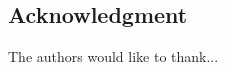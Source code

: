 \documentclass[journal]{IEEEtran}
\begin{document}
\begin{multicols}{2}
%





\section*{Acknowledgment}


The authors would like to thank...


\ifCLASSOPTIONcaptionsoff
  \newpage
\fi







%


\end{multicols}
\end{document}
